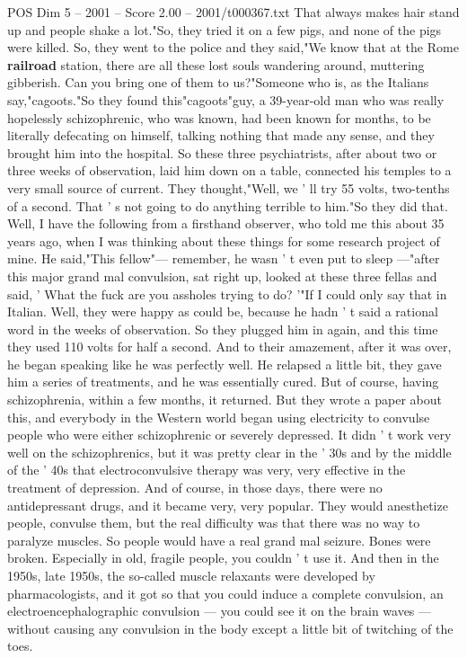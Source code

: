 \begin{textsample}{POS Dim 5 – 2001 – Score 2.00 – 2001/t000367.txt}
That always makes hair stand up and people shake a lot."So, they tried it on a few pigs, and none of the pigs were killed.
So, they went to the police and they said,"We know that at the Rome \textbf{railroad} station, there are all these lost souls wandering around, muttering gibberish.
Can you bring one of them to us?"Someone who is, as the Italians say,"cagoots."So they found this"cagoots"guy, a 39-year-old man who was really hopelessly schizophrenic, who was known, had been known for months, to be literally defecating on himself, talking nothing that made any sense, and they brought him into the hospital.
So these three psychiatrists, after about two or three weeks of observation, laid him down on a table, connected his temples to a very small source of current.
They thought,"Well, we ' ll try 55 volts, two-tenths of a second.
That ' s not going to do anything terrible to him."So they did that.
Well, I have the following from a firsthand observer, who told me this about 35 years ago, when I was thinking about these things for some research project of mine.
He said,"This fellow"— remember, he wasn ' t even put to sleep —"after this major grand mal convulsion, sat right up, looked at these three fellas and said, ' What the fuck are you assholes trying to do? '"If I could only say that in Italian.
Well, they were happy as could be, because he hadn ' t said a rational word in the weeks of observation.
So they plugged him in again, and this time they used 110 volts for half a second.
And to their amazement, after it was over, he began speaking like he was perfectly well.
He relapsed a little bit, they gave him a series of treatments, and he was essentially cured.
But of course, having schizophrenia, within a few months, it returned.
But they wrote a paper about this, and everybody in the Western world began using electricity to convulse people who were either schizophrenic or severely depressed.
It didn ' t work very well on the schizophrenics, but it was pretty clear in the ' 30s and by the middle of the ' 40s that electroconvulsive therapy was very, very effective in the treatment of depression.
And of course, in those days, there were no antidepressant drugs, and it became very, very popular.
They would anesthetize people, convulse them, but the real difficulty was that there was no way to paralyze muscles.
So people would have a real grand mal seizure.
Bones were broken.
Especially in old, fragile people, you couldn ' t use it.
And then in the 1950s, late 1950s, the so-called muscle relaxants were developed by pharmacologists, and it got so that you could induce a complete convulsion, an electroencephalographic convulsion — you could see it on the brain waves — without causing any convulsion in the body except a little bit of twitching of the toes.

\end{textsample}
